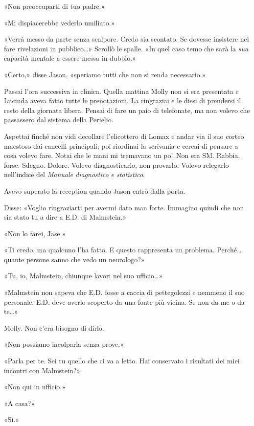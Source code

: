 «Non preoccuparti di tuo padre.»

«Mi dispiacerebbe vederlo umiliato.»

«Verrà messo da parte senza scalpore. Credo sia scontato. Se dovesse
insistere nel fare rivelazioni in pubblico\ldots» Scrollò le spalle. «In
quel caso temo che sarà la \emph{sua} capacità mentale a essere messa in
dubbio.»

«Certo,» disse Jason, «speriamo tutti che non si renda necessario.»

\separatorefiori

Passai l'ora successiva in clinica. Quella mattina Molly non si era
presentata e Lucinda aveva fatto tutte le prenotazioni. La ringraziai e
le dissi di prendersi il resto della giornata libera. Pensai di fare un
paio di telefonate, ma non volevo che passassero dal sistema della
Perielio.

Aspettai finché non vidi decollare l'elicottero di Lomax e andar via il
suo corteo maestoso dai cancelli principali; poi riordinai la scrivania
e cercai di pensare a cosa volevo fare. Notai che le mani mi tremavano
un po'. Non era SM. Rabbia, forse. Sdegno. Dolore. Volevo
diagnosticarlo, non provarlo. Volevo relegarlo nell'indice del
\emph{Manuale diagnostico e statistico}.

Avevo superato la reception quando Jason entrò dalla porta.

Disse: «Voglio ringraziarti per avermi dato man forte. Immagino quindi
che non sia stato tu a dire a E.D. di Malmstein.»

«Non lo farei, Jase.»

«Ti credo, ma qualcuno l'ha fatto. E questo rappresenta un problema.
Perché\ldots{} quante persone sanno che vedo un neurologo?»

«Tu, io, Malmstein, chiunque lavori nel suo ufficio\ldots»

«Malmstein non sapeva che E.D. fosse a caccia di pettegolezzi e nemmeno
il suo personale. E.D. deve averlo scoperto da una fonte più vicina. Se
non da me o da te\ldots»

Molly. Non c'era bisogno di dirlo.

«Non possiamo incolparla senza prove.»

«Parla per te. Sei tu quello che ci va a letto. Hai conservato i
risultati dei miei incontri con Malmstein?»

«Non qui in ufficio.»

«A casa?»

«Sì.»

